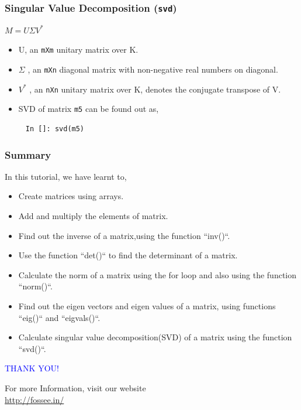 \documentclass[presentation]{beamer}
\begin{document}
\begin{frame}[fragile]
\frametitle{Singular Value Decomposition (\verb~svd~)}
\label{sec-12}

    $M = U \Sigma V^*$

\begin{itemize}
\item U, an \verb~mXm~ unitary matrix over K.
\item $\Sigma$
        , an \verb~mXn~ diagonal matrix with non-negative real numbers on diagonal.
\item $V^*$
        , an \verb~nXn~ unitary matrix over K, denotes the conjugate transpose of V.
\item SVD of matrix \verb~m5~ can be found out as,
\end{itemize}
\begin{verbatim}
     In []: svd(m5)
\end{verbatim}
\end{frame}
\begin{frame}
\frametitle{Summary}
\label{sec-13}

  In this tutorial, we have learnt to, 


\begin{itemize}
\item Create matrices using arrays.
\item Add and multiply the elements of matrix.
\item Find out the inverse of a matrix,using the function ``inv()``.
\item Use the function ``det()`` to find the determinant of a matrix.
\item Calculate the norm of a matrix using the for loop and also using 
    the function ``norm()``.
\item Find out the eigen vectors and eigen values of a matrix, using 
    functions ``eig()`` and ``eigvals()``.
\item Calculate singular value decomposition(SVD) of a matrix using the 
    function ``svd()``.
\end{itemize}
 
\end{frame}
\begin{frame}

  \begin{block}{}
  \begin{center}
  \textcolor{blue}{\Large THANK YOU!} 
  \end{center}
  \end{block}
\begin{block}{}
  \begin{center}
    For more Information, visit our website\\
    \url{http://fossee.in/}
  \end{center}  
  \end{block}
\end{frame}
\end{document}
